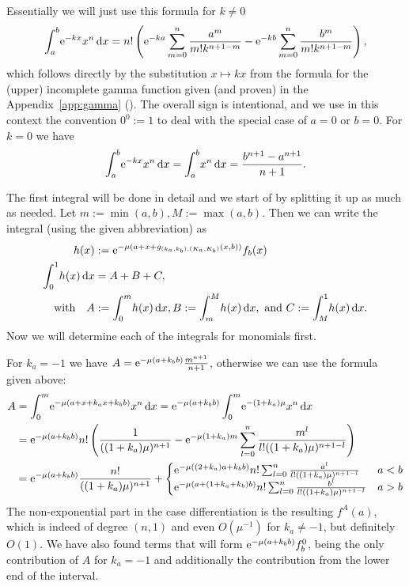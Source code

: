 \begin{Lemma}
  \begin{Proof}
    Essentially we will just use this formula for $k \neq 0$
    \begin{align}
      \Integ[b]{a}{x}{\Eto{-kx}x^n}
        = n!\left(\Eto{-ka}\sum_{m=0}^n \frac{a^m}{m!k^{n+1-m}} -
                  \Eto{-kb}\sum_{m=0}^n \frac{b^m}{m!k^{n+1-m}}\right),
    \end{align}
    which follows directly by the substitution $x \mapsto kx$ from the formula
    for the (upper) incomplete gamma function given (and proven) in the
    Appendix~\ref{app:gamma} ().
    The overall sign is intentional, and we use in this context the convention
    $0^0 := 1$ to deal with the special case of $a = 0$ or $b = 0$. For $k = 0$
    we have
    \begin{align}
      \Integ[b]{a}{x}{\Eto{-kx}x^n} = \Integ[b]{a}{x}{x^n} = \frac{b^{n+1} -
      a^{n+1}}{n+1}.
    \end{align}

    The first integral will be done in detail and we start of by splitting it up
    as much as needed. Let $m := \min(a,b), M := \max(a,b)$. Then we can write
    the integral (using the given abbreviation) as
    \begin{align*}
      h(x) &:= \Eto{-\mu(a+x+g_{(k_a,k_b),(K_a,K_b)}(x, b))}f_b(x) \\
      \Int{x}{h(x)} &= A + B + C, \\ \text{with} \quad
      A &:= \Integ[m]{0}{x}{h(x)},
      B := \Integ[M]{m}{x}{h(x)},\text{ and }
      C := \Integ[1]{M}{x}{h(x)}.
    \end{align*}
    Now we will determine each of the integrals for monomials first.
    
    For $k_a = -1$ we have $A = \Eto{-\mu (a+k_b b)} \frac{m^{n+1}}{n+1}$,
    otherwise we can use the formula given above:
    \begin{align*}
      A &= \Integ[m]{0}{x}{\Eto{-\mu(a+x+k_a x+k_b b)}x^n}
         = \Eto{-\mu(a+k_b b)} \Integ[m]{0}{x}{\Eto{-(1+k_a)\mu}x^n} \\
        &= \Eto{-\mu(a+k_b b)} n! \left(
         \frac{1}{((1+k_a)\mu)^{n+1}}
         - \Eto{-\mu(1+k_a)m}\sum_{l=0}^n \frac{m^l}{l! ((1+k_a)\mu)^{n+1-l}}
        \right) \\
      &= \Eto{-\mu(a+k_b b)} \frac{n!}{((1+k_a)\mu)^{n+1}} +
        \begin{cases}
        \Eto{-\mu((2+k_a) a+k_b b)} n! \sum_{l=0}^n
        \frac{a^l}{l!((1+k_a)\mu)^{n+1-l}}
          & a < b \\
          \Eto{-\mu(a + (1+k_a+k_b)b)} n! \sum_{l=0}^n
          \frac{b^l}{l!((1+k_a)\mu)^{n+1-l}}
          & a > b
      \end{cases}
    \end{align*}
    The non-exponential part in the case differentiation is the resulting
    $f^A(a)$, which is indeed of degree $(n,1)$ and even $O(\mu^{-1})$ for
    $k_a\neq -1$, but definitely $O(1)$. We have also found terms that will form
    $\Eto{-\mu(a+k_b b)} f^0_b$, being the only contribution of $A$ for $k_a
    = -1$ and additionally the contribution from the lower end of the interval.


\end{Proof}
\end{Lemma}
